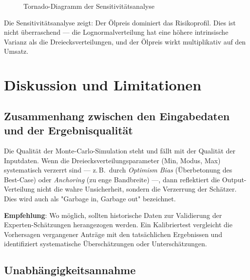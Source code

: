 \documentclass[11pt,a4paper]{article}
\begin{document}
\begin{figure}[H]
\centering
{}
\caption{Tornado-Diagramm der Sensitivitätsanalyse}
\end{figure}

Die Sensitivitätsanalyse zeigt: Der Ölpreis dominiert das Risikoprofil. Dies ist nicht überraschend — die Lognormalverteilung hat eine höhere intrinsische Varianz als die Dreiecksverteilungen, und der Ölpreis wirkt multiplikativ auf den Umsatz.

\section{Diskussion und Limitationen}
\label{sec:limitationen}

\subsection{Zusammenhang zwischen den Eingabedaten und der Ergebnisqualität}

Die Qualität der Monte-Carlo-Simulation steht und fällt mit der Qualität der Inputdaten. Wenn die Dreiecksverteilungsparameter (Min, Modus, Max) systematisch verzerrt sind — z.\,B.\ durch \textit{Optimism Bias} (Überbetonung des Best-Case) oder \textit{Anchoring} (zu enge Bandbreite) —, dann reflektiert die Output-Verteilung nicht die wahre Unsicherheit, sondern die Verzerrung der Schätzer. Dies wird auch als "Garbage in, Garbage out" bezeichnet.

\textbf{Empfehlung}: Wo möglich, sollten historische Daten zur Validierung der Experten-Schätzungen herangezogen werden. Ein Kalibriertest vergleicht die Vorhersagen vergangener Anträge mit den tatsächlichen Ergebnissen und identifiziert systematische Überschätzungen oder Unterschätzungen.

\subsection{Unabhängigkeitsannahme}
\end{document}
